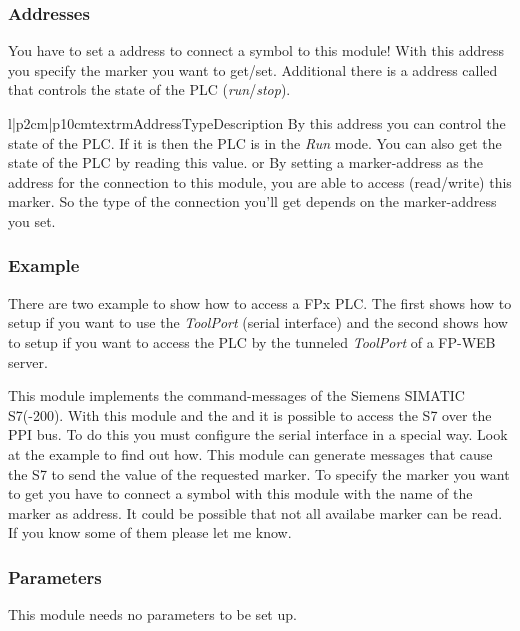 \subsubsection{Addresses}
You have to set a address to connect a symbol to this module! With this 
address you specify the marker you want to get/set. Additional there is a
address called  that controls the state of the PLC 
(\emph{run}/\emph{stop}).
\begin{tableiii}{l|p{2cm}|p{10cm}}{textrm}{Address}{Type}{Description}
        {}
        {By this address you can control the state of the PLC. If it is 
          then the PLC is in the \emph{Run} mode. You can also
         get the state of the PLC by reading this value.}
        { or
         }
        {By setting a marker-address as the address for the connection to this 
         module, you are able to access (read/write) this marker. So the type 
         of the connection you'll get depends on the marker-address you set.} 
\end{tableiii}

\subsubsection{Example}
There are two example to show how to access a FPx PLC. The first shows how to 
setup if you want to use the \emph{ToolPort} (serial interface) and the second
shows how to setup if you want to access the PLC by the tunneled 
\emph{ToolPort} of a FP-WEB server.




%
%
%
This module implements the command-messages of the Siemens SIMATIC S7(-200). 
With this module and the  and 
 it is possible to access the S7 over the 
PPI bus. To do this you must configure the serial interface in a special way. 
Look at the example to find out how. This module can generate messages that 
cause the S7 to send the value of the requested marker. To specify the marker 
you want to get you have to connect a symbol with this module with the name of
the marker as address. It could be possible that not all availabe marker can be
read. If you know some of them please let me know.

\subsubsection{Parameters}
This module needs no parameters to be set up.

